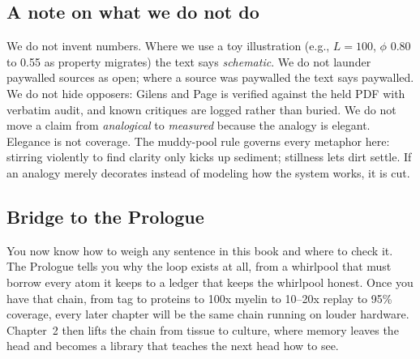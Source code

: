 \subsection*{A note on what we do not do}

We do not invent numbers. Where we use a toy illustration (e.g., $L=100$, $\phi$ 0.80 to 0.55 as property migrates) the text says \textit{schematic}. We do not launder paywalled sources as open; where a source was paywalled the text says paywalled. We do not hide opposers: Gilens and Page \citep{gilens2014} is verified against the held PDF with verbatim audit, and known critiques are logged rather than buried. We do not move a claim from \textit{analogical} to \textit{measured} because the analogy is elegant. Elegance is not coverage. The muddy-pool rule governs every metaphor here: stirring violently to find clarity only kicks up sediment; stillness lets dirt settle. If an analogy merely decorates instead of modeling how the system works, it is cut.

\subsection*{Bridge to the Prologue}

You now know how to weigh any sentence in this book and where to check it. The Prologue tells you why the loop exists at all, from a whirlpool that must borrow every atom it keeps to a ledger that keeps the whirlpool honest. Once you have that chain, from tag to proteins to 100x myelin to 10--20x replay to 95\% coverage, every later chapter will be the same chain running on louder hardware. Chapter~2 then lifts the chain from tissue to culture, where memory leaves the head and becomes a library that teaches the next head how to see.
